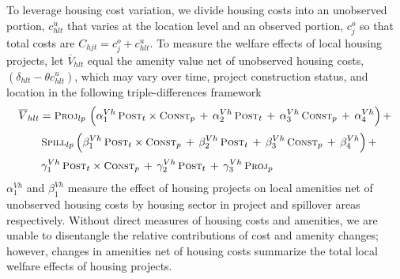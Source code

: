 \documentclass[12pt]{article}
\begin{document}
To leverage housing cost variation, we divide housing costs into an unobserved portion, $c^{u}_{hlt}$ that varies at the location level and an observed portion, $c^{o}_{j}$ so that total costs are $C_{hjt} =  c^{o}_{j}+ c^{u}_{hlt}$.  To measure the welfare effects of local housing projects, let $ \overline{V}_{hlt}$ equal the amenity value net of unobserved housing costs, $(\delta_{hlt}- \theta c^{u}_{hlt} )$, which may vary over time, project construction status, and location in the following triple-differences framework
\begin{align*}
 \overline{V}_{hlt} &=  \textsc{\small Proj}_{lp} \,\, \Big( \alpha^{Vh}_1 \, \textsc{\small Post}_{t}\times\textsc{\small Const}_{p} \, + \, \alpha^{Vh}_2 \, \textsc{\small Post}_{t} \, + \, \alpha^{Vh}_3 \, \textsc{\small Const}_{p}\, +\, \alpha^{Vh}_4 \Big) \, + \\[.2em]
& \, \textsc{\small Spill}_{lp} \, \Big( \beta^{Vh}_1 \, \textsc{\small Post}_{t}\times\textsc{\small Const}_{p} \, + \, \beta^{Vh}_2 \, \textsc{\small Post}_{t} \, + \, \beta^{Vh}_3 \, \textsc{\small Const}_{p} \, +\, \beta^{Vh}_4 \Big) \, + \\[.2em]
& \, \gamma^{Vh}_1 \,  \textsc{\small Post}_{t}\times\textsc{\small Const}_{p} \, + \, \gamma^{Vh}_2 \,\textsc{\small Post}_{t} \, + \, \gamma^{Vh}_3 \,  \textsc{\small Proj}_{p}
\end{align*}
$\alpha^{Vh}_1$ and $\beta^{Vh}_1$ measure the effect of housing projects on local amenities net of unobserved housing costs by housing sector in project and spillover areas respectively.  Without direct measures of housing costs and amenities, we are unable to disentangle the relative contributions of cost and amenity changes; however, changes in amenities net of housing costs summarize the total local welfare effects of housing projects. 
\end{document}
